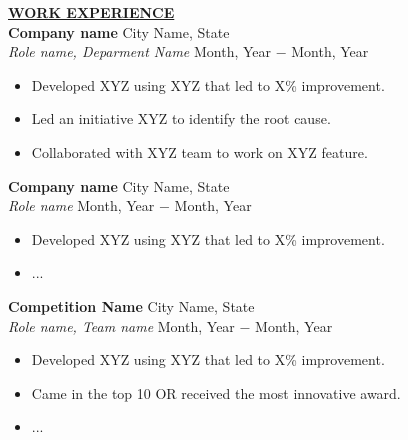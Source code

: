 \documentclass{article}
\begin{document}
% 
%
\noindent \textbf{\underline{WORK EXPERIENCE}} \\
\noindent \textbf{Company name} \hfill City Name, State \\
\textit{Role name, Deparment Name} \hfill Month, Year $-$ Month, Year
\begin{itemize}[noitemsep,nolistsep,leftmargin=*]
\item {Developed XYZ using XYZ that led to X\% improvement.}
\item {Led an initiative XYZ to identify the root cause.}
\item {Collaborated with XYZ team to work on XYZ feature. \\}
\end{itemize}

\noindent \textbf{Company name} \hfill City Name, State \\
\textit{Role name} \hfill Month, Year $-$ Month, Year
\begin{itemize}[noitemsep,nolistsep,leftmargin=*]
\item {Developed XYZ using XYZ that led to X\% improvement.}
\item {... \\}
\end{itemize}

\noindent \textbf{Competition Name} \hfill City Name, State \\
\textit{Role name, Team name} \hfill Month, Year $-$ Month, Year
\begin{itemize}[noitemsep,nolistsep,leftmargin=*]
\item {Developed XYZ using XYZ that led to X\% improvement.}
\item{Came in the top 10 OR received the most innovative award.}
\item {... \\}
\end{itemize}
\end{document}
